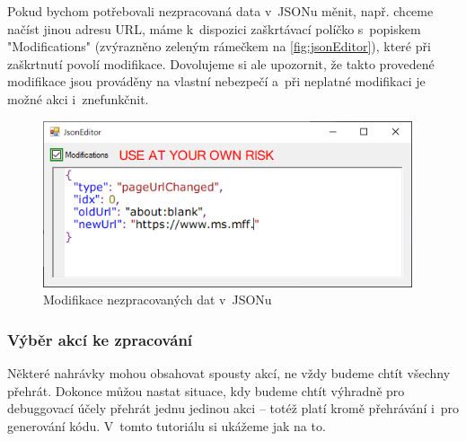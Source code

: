\documentclass[12pt, a4paper, twoside]{article}
\begin{document}
	\newpage
	Pokud bychom potřebovali nezpracovaná data v~JSONu měnit, např. chceme načíst jinou adresu URL, máme k~dispozici zaškrtávací políčko s~popiskem "Modifications" (zvýrazněno zeleným rámečkem na \cref{fig:jsonEditor}), které při zaškrtnutí povolí modifikace. Dovolujeme si ale upozornit, že takto provedené modifikace jsou prováděny na vlastní nebezpečí a~při neplatné modifikaci je možné akci i~znefunkčnit.
	\begin{figure}[H]
		\centering
		\includegraphics[width=0.97\textwidth]{jsonModificationInProgress.png}
		\caption{Modifikace nezpracovaných dat v~JSONu}
	\end{figure}
	\subsubsection{Výběr akcí ke zpracování}
	Některé nahrávky mohou obsahovat spousty akcí, ne vždy budeme chtít všechny přehrát. Dokonce můžou nastat situace, kdy budeme chtít výhradně pro debuggovací účely přehrát jednu jedinou akci -- totéž platí kromě přehrávání i~pro generování kódu. V~tomto tutoriálu si ukážeme jak na to.
	
\end{document}
